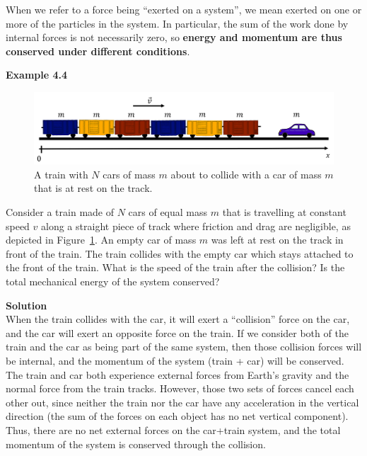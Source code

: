 When we refer to a force being ``exerted on a system'', we mean exerted on one or more of the particles in the system. In particular, the sum of the work done by internal forces is not necessarily zero, so \textbf{energy and momentum are thus conserved under different conditions}.

\begin{framed}
\textbf{Example 4.4}\\
\begin{figure}[!htbp]
\centering
\includegraphics[width=0.8\linewidth]{files/train-d2c8c3f4754121be98bc464317511478.png}
\caption[]{A train with $N$ cars of mass $m$ about to collide with a car of mass $m$ that is at rest on the track.}
\label{fig:momentumandcm:train}
\end{figure}

Consider a train made of $N$ cars of equal mass $m$ that is travelling at constant speed $v$ along a straight piece of track where friction and drag are negligible, as depicted in Figure~\ref{fig:momentumandcm:train}. An empty car of mass $m$ was left at rest on the track in front of the train. The train collides with the empty car which stays attached to the front of the train. What is the speed of the train after the collision? Is the total mechanical energy of the system conserved?

\begin{framed}
\textbf{Solution}\\
When the train collides with the car, it will exert a ``collision'' force on the car, and the car will exert an opposite force on the train. If we consider both of the train and the car as being part of the same system, then those collision forces will be internal, and the momentum of the system (train + car) will be conserved. The train and car both experience external forces from Earth's gravity and the normal force from the train tracks. However, those two sets of forces cancel each other out, since neither the train nor the car have any acceleration in the vertical direction (the sum of the forces on each object has no net vertical component). Thus, there are no net external forces on the car+train system, and the total momentum of the system is conserved through the collision.


\end{framed}
\end{framed}
